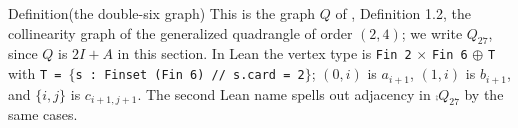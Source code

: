 \begin{namedresult}{Definition}{(the double-six graph)}\label{def:414-gq24}
 \uses{}
 This is the graph $Q$ of , Definition 1.2, the collinearity
 graph of the generalized quadrangle of order $(2,4)$; we write $Q_{27}$, since $Q$ is $2I+A$ in
 this section. In Lean the vertex type is \texttt{Fin 2} $\times$ \texttt{Fin 6} $\oplus$
 \texttt{T} with \texttt{T = $\{$s : Finset (Fin 6) // s.card = 2$\}$}; $(0,i)$ is $a_{i+1}$, $(1,i)$
 is $b_{i+1}$, and $\{i,j\}$ is $c_{i+1,j+1}$. The second Lean name spells out adjacency in
 $\comp{Q_{27}}$ by the same cases.
\end{namedresult}

